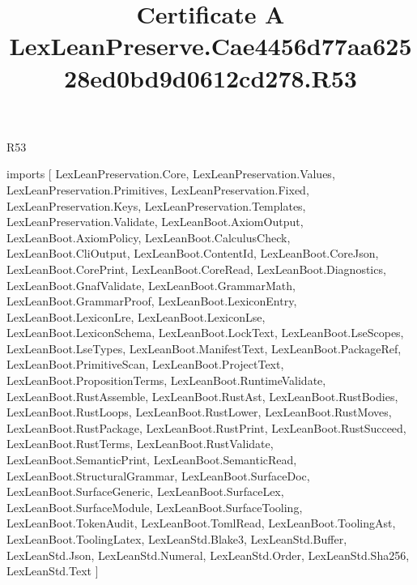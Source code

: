 \begin{lexlean}{R53}
\title{Certificate A LexLeanPreserve.Cae4456d77aa62528ed0bd9d0612cd278.R53}
\begin{coremodule}
imports [
  LexLeanPreservation.Core,
  LexLeanPreservation.Values,
  LexLeanPreservation.Primitives,
  LexLeanPreservation.Fixed,
  LexLeanPreservation.Keys,
  LexLeanPreservation.Templates,
  LexLeanPreservation.Validate,
  LexLeanBoot.AxiomOutput,
  LexLeanBoot.AxiomPolicy,
  LexLeanBoot.CalculusCheck,
  LexLeanBoot.CliOutput,
  LexLeanBoot.ContentId,
  LexLeanBoot.CoreJson,
  LexLeanBoot.CorePrint,
  LexLeanBoot.CoreRead,
  LexLeanBoot.Diagnostics,
  LexLeanBoot.GnafValidate,
  LexLeanBoot.GrammarMath,
  LexLeanBoot.GrammarProof,
  LexLeanBoot.LexiconEntry,
  LexLeanBoot.LexiconLre,
  LexLeanBoot.LexiconLse,
  LexLeanBoot.LexiconSchema,
  LexLeanBoot.LockText,
  LexLeanBoot.LseScopes,
  LexLeanBoot.LseTypes,
  LexLeanBoot.ManifestText,
  LexLeanBoot.PackageRef,
  LexLeanBoot.PrimitiveScan,
  LexLeanBoot.ProjectText,
  LexLeanBoot.PropositionTerms,
  LexLeanBoot.RuntimeValidate,
  LexLeanBoot.RustAssemble,
  LexLeanBoot.RustAst,
  LexLeanBoot.RustBodies,
  LexLeanBoot.RustLoops,
  LexLeanBoot.RustLower,
  LexLeanBoot.RustMoves,
  LexLeanBoot.RustPackage,
  LexLeanBoot.RustPrint,
  LexLeanBoot.RustSucceed,
  LexLeanBoot.RustTerms,
  LexLeanBoot.RustValidate,
  LexLeanBoot.SemanticPrint,
  LexLeanBoot.SemanticRead,
  LexLeanBoot.StructuralGrammar,
  LexLeanBoot.SurfaceDoc,
  LexLeanBoot.SurfaceGeneric,
  LexLeanBoot.SurfaceLex,
  LexLeanBoot.SurfaceModule,
  LexLeanBoot.SurfaceTooling,
  LexLeanBoot.TokenAudit,
  LexLeanBoot.TomlRead,
  LexLeanBoot.ToolingAst,
  LexLeanBoot.ToolingLatex,
  LexLeanStd.Blake3,
  LexLeanStd.Buffer,
  LexLeanStd.Json,
  LexLeanStd.Numeral,
  LexLeanStd.Order,
  LexLeanStd.Sha256,
  LexLeanStd.Text
]


\end{coremodule}
\end{lexlean}
